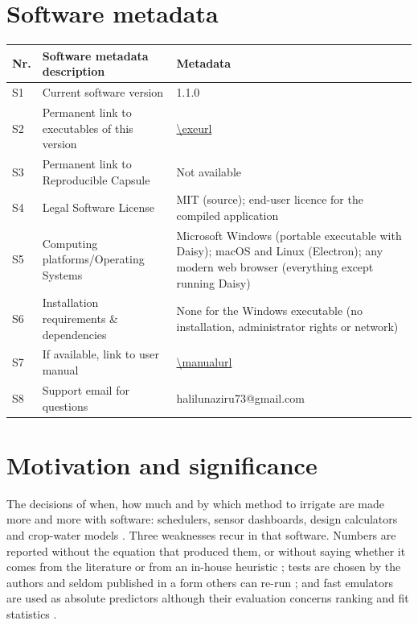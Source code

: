 \documentclass[preprint,12pt]{elsarticle}
\begin{document}
\section*{Software metadata}
\begin{table}[H]\centering\small
\begin{tabularx}{\textwidth}{lp{5.2cm}X}
\toprule
Nr. & Software metadata description & Metadata\\\midrule
S1 & Current software version & 1.1.0\\
S2 & Permanent link to executables of this version & \url{\exeurl}\\
S3 & Permanent link to Reproducible Capsule & Not available\\
S4 & Legal Software License & MIT (source); end-user licence for the compiled application\\
S5 & Computing platforms/Operating Systems & Microsoft Windows (portable executable with Daisy); macOS and Linux (Electron); any modern web browser (everything except running Daisy)\\
S6 & Installation requirements \& dependencies & None for the Windows executable (no installation, administrator rights or network)\\
S7 & If available, link to user manual & \url{\manualurl}\\
S8 & Support email for questions & halilunaziru73@gmail.com\\\bottomrule
\end{tabularx}
\end{table}

\linenumbers
\section{Motivation and significance}
The decisions of when, how much and by which method to irrigate are made more and more with software: schedulers, sensor dashboards, design calculators and crop-water models \cite{Fereres2007,Geerts2009,Pereira2012,Datta2023,Garcia2020,Jones2004}. Three weaknesses recur in that software. Numbers are reported without the equation that produced them, or without saying whether it comes from the literature or from an in-house heuristic \cite{Jakeman2006,Refsgaard2004}; tests are chosen by the authors and seldom published in a form others can re-run \cite{Hutton2016,Wilkinson2016}; and fast emulators are used as absolute predictors although their evaluation concerns ranking and fit statistics \cite{Bennett2013,Moriasi2007,Legates1999,Razavi2012,Asher2015}.
\end{document}
